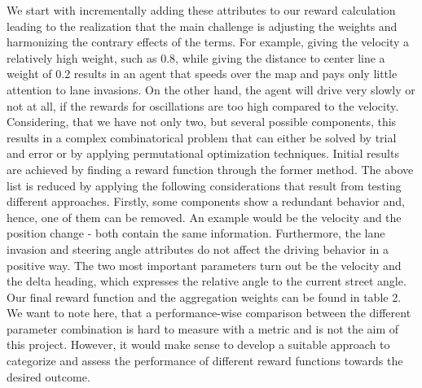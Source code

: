 \documentclass[letterpaper, 10 pt, conference]{ieeeconf}  %
\begin{document}
We start with incrementally adding these attributes to our reward calculation leading to the realization that the main challenge is adjusting the weights and harmonizing the contrary effects of the terms.
For example, giving the velocity a relatively high weight, such as 0.8, while giving the distance to center line a weight of 0.2 results in an agent that speeds over the map and pays only little attention to lane invasions. On the other hand, the agent will drive very slowly or not at all, if the rewards for oscillations are too high compared to the velocity. Considering, that we have not only two, but several possible components, this results in a complex combinatorical problem that can either be solved by trial and error or by applying permutational optimization techniques. Initial results are achieved by finding a reward function through the former method. 
\newline
The above list is reduced by applying the following considerations that result from testing different approaches. Firstly, some components show a redundant behavior and, hence, one of them can be removed. An example would be the velocity and the position change - both contain the same information. Furthermore, the lane invasion and steering angle attributes do not affect the driving behavior in a positive way. The two most important parameters turn out be the velocity and the delta heading, which expresses the relative angle to the current street angle. Our final reward function and the aggregation weights can be found in table 2.
\newline
We want to note here, that a performance-wise comparison between the different parameter combination is hard to measure with a metric and is not the aim of this project. However, it would make sense to develop a suitable approach to categorize and assess the performance of different reward functions towards the desired outcome. 
\end{document}
